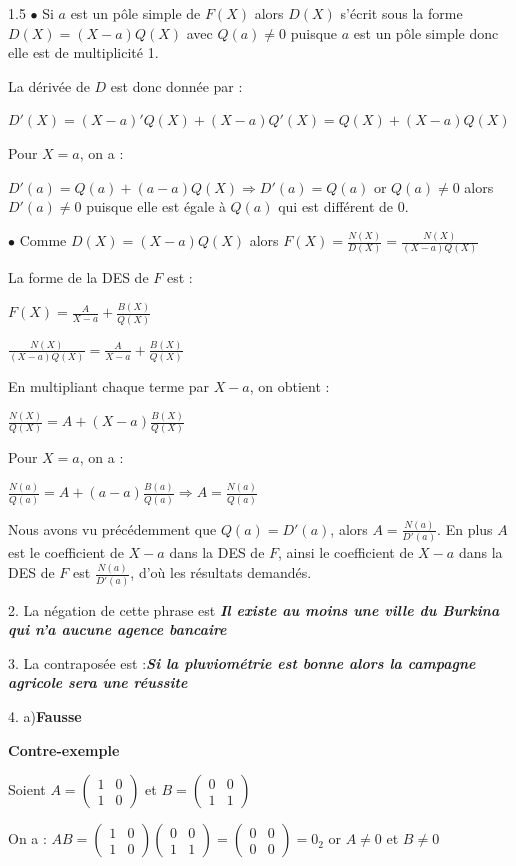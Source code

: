 \documentclass[12pt]{article}
\begin{document}
\begin{spacing}{1.5}
$\bullet$ Si $a$ est un pôle simple de $F(X)$ alors $D(X)$ s'écrit sous la forme $D(X)=(X-a)Q(X)$ avec $Q(a)\neq 0$ puisque $a$  est un pôle simple donc elle est de multiplicité 1.


La dérivée de $D$ est donc donnée par :

$D'(X)=(X-a)'Q(X)+(X-a)Q'(X)=Q(X)+(X-a)Q(X)$

Pour $X=a$, on a :

$D'(a)=Q(a)+(a-a)Q(X)\Rightarrow D'(a)=Q(a)$ or $Q(a)\neq 0$ alors $D'(a)\neq 0$ puisque elle est égale à $Q(a)$ qui est différent de 0.

\quad
$\bullet$ Comme $D(X)=(X-a)Q(X)$ alors $F(X)=\frac{N(X)}{D(X)}=\frac{N(X)}{(X-a)Q(X)}$

 La forme de la DES de $F$ est : 

$F(X)=\frac{A}{X-a}+\frac{B(X)}{Q(X)}$

$\frac{N(X)}{(X-a)Q(X)}=\frac{A}{X-a}+\frac{B(X)}{Q(X)}$

En multipliant chaque terme par $X-a$, on obtient :

$\frac{N(X)}{Q(X)}=A+(X-a)\frac{B(X)}{Q(X)}$

Pour $X=a$, on a :

$\frac{N(a)}{Q(a)}=A+(a-a)\frac{B(a)}{Q(a)}\Rightarrow A=\frac{N(a)}{Q(a)}$

Nous avons vu précédemment que 
$Q(a)=D'(a)$, alors $A=\frac{N(a)}{D'(a)}$. En plus $A$ est le coefficient de $X-a$ dans la DES de $F$, ainsi le coefficient de $X-a$ dans la DES de $F$ est $\frac{N(a)}{D'(a)}$, d'où les résultats demandés.


2. La négation de cette phrase est \textbf{\emph{Il existe au moins une ville du Burkina qui n'a aucune agence bancaire}}

3. La contraposée est :\textbf{\emph{Si la pluviométrie est bonne alors la campagne agricole sera une réussite}}

4. a)\textbf{Fausse}

\textbf{Contre-exemple}

Soient $A=\begin{pmatrix}
1 & 0 \\ 
1 & 0
\end{pmatrix}$ et $B=\begin{pmatrix}
0 & 0 \\ 
1 & 1
\end{pmatrix}$

On a : $AB=\begin{pmatrix}
1 & 0 \\ 
1 & 0
\end{pmatrix}\begin{pmatrix}
0 & 0 \\ 
1 & 1
\end{pmatrix}=\begin{pmatrix}
0 & 0 \\ 
0 & 0
\end{pmatrix}=0_2$ or $A\neq 0$ et $B\neq 0$


\end{spacing}
\end{document}
